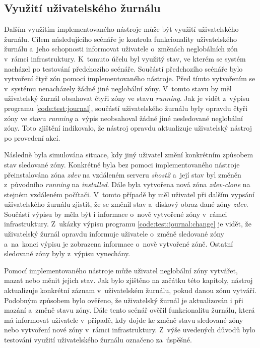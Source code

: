 \subsection{Využití uživatelského žurnálu}
\label{chapter:testing:scenario:journal}
Dalším využitím implementovaného nástroje může být využití uživatelského žurnálu. Cílem následujícího scénáře je kontrola 
funkcionality uživatelského žurnálu a~jeho schopnosti informovat uživatele o~změnách neglobálních zón v~rámci infrastruktury.
K~tomuto účelu byl využitý stav, ve kterém se systém nacházel po testování předchozího scénáře. Součástí předchozího scénáře
bylo vytvoření čtyř zón pomocí implementovaného
nástroje. Před tímto vytvořením se v~systému nenacházely žádné jiné neglobální zóny. V~tomto stavu by měl uživatelský žurnál 
obsahovat čtyři zóny ve stavu \textit{running}. Jak je vidět z~výpisu programu \ref{code:test:journal}, součástí uživatelského
žurnálu byly opravdu čtyři zóny ve stavu \textit{running} a~výpis neobsahoval žádné jiné nesledované neglobální zóny.
Toto zjištění indikovalo, že nástroj opravdu aktualizuje uživatelský nástroj po provedení akcí.

Následně byla simulována situace, kdy jiný uživatel změní konkrétním způsobem stav sledované zóny. Konkrétně byla bez pomoci 
implementovaného nástroje přeinstalována zóna \textit{zdev} na vzdáleném serveru \textit{shost2} a~její stav byl změněn z~původního
\textit{running} na \textit{installed}. Dále byla vytvořena nová zóna \textit{zdev-clone} na stejném vzdáleném počítači. V~tomto
případě by měl uživatel při dalším vypsání uživatelského žurnálu zjistit, že se změnil stav a~diskový obraz dané zóny 
\textit{zdev}. Součástí výpisu by měla být i informace o~nově vytvořené zóny v~rámci infrastruktury. Z~ukázky výpisu programu 
\ref{code:test:journal:change} je vidět, že uživatelský žurnál opravdu informuje uživatele o~změně sledované zóny a~na~konci
výpisu je zobrazena informace o~nově vytvořené zóně. Ostatní sledované zóny byly z~výpisu vynechány.

Pomocí implementovaného nástroje může uživatel neglobální zóny vytvářet, mazat nebo měnit jejich stav. Jak bylo zjištěno
na začátku této kapitoly, nástroj aktualizuje konkrétní záznam v~uživatelském žurnálu, pokud danou zónu vytváří. Podobným
způsobem bylo ověřeno, že uživatelský žurnál je aktualizován i při mazání a~změně stavu zóny. Dále tento scénář ověřil funkcionalitu
žurnálu, která má informovat uživatele v~případě, kdy dojde ke změně stavu sledované zóny nebo vytvoření nové zóny v~rámci
infrastruktury. Z~výše uvedených důvodů bylo testování využití uživatelského žurnálu označeno za~úspěšné.
